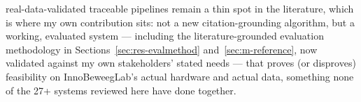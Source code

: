 real-data-validated traceable pipelines remain a thin spot in the literature, which is where my own contribution sits: not a new citation-grounding algorithm, but a working, evaluated system — including the literature-grounded evaluation methodology in Sections~\ref{sec:res-evalmethod} and~\ref{sec:m-reference}, now validated against my own stakeholders' stated needs — that proves (or disproves) feasibility on InnoBeweegLab's actual hardware and actual data, something none of the 27+ systems reviewed here have done together.


